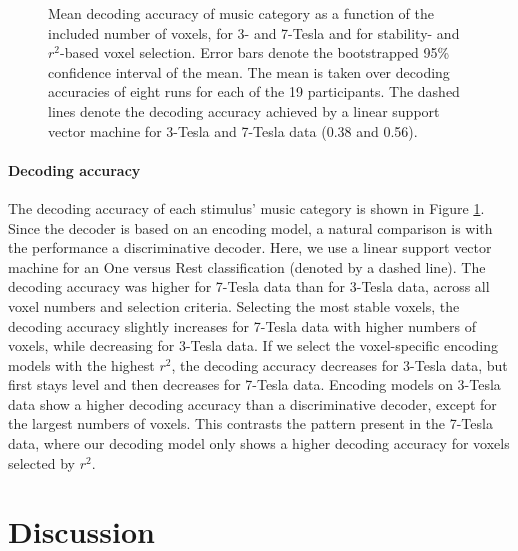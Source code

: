 \begin{figure}
  \centering
  \def\svgwidth{\linewidth}
  

  \caption{Mean decoding accuracy of music category as a function of the included number of
  voxels, for 3- and 7-Tesla and for stability- and $r^2$-based voxel selection. Error bars denote the bootstrapped 95\% confidence
  interval of the mean. The mean is taken over decoding accuracies of
  eight runs for each of the 19 participants. The dashed lines denote the
  decoding accuracy achieved by a linear support vector machine for 3-Tesla
  and 7-Tesla data (0.38 and 0.56).}

 \label{fig:decoding_accuracy}
\end{figure}

\paragraph{Decoding accuracy}

The decoding accuracy of each stimulus' music category is shown in Figure
\ref{fig:decoding_accuracy}. Since the decoder is based on an encoding model, a
natural comparison is with the performance a discriminative decoder. Here, we
use a linear support vector machine for an One versus Rest classification
(denoted by a dashed line). The decoding accuracy was higher for 7-Tesla data
than for 3-Tesla data, across all voxel numbers and selection criteria.
Selecting the most stable voxels, the decoding accuracy slightly increases for
7-Tesla data with higher numbers of voxels, while decreasing for 3-Tesla data.
If we select the voxel-specific encoding models with the highest $r^2$, the
decoding accuracy decreases for 3-Tesla data, but first stays level and then
decreases for 7-Tesla data. Encoding models on 3-Tesla data show a higher
decoding accuracy than a discriminative decoder, except for the largest numbers
of voxels. This contrasts the pattern present in the 7-Tesla data, where our decoding model only
shows a higher decoding accuracy for voxels selected by $r^2$.



\section*{Discussion}

